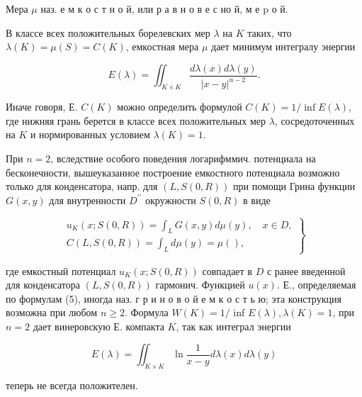 \documentclass[10pt]{article}
\begin{document}
Мера $\mu$ наз. е м к о с т н о й, или р а в н о в е с но й, м е p о й.



В классе всех положительных борелевских мер $\lambda$ на $K$ таких, что $\lambda(K)=\mu(S)=C(K)$, емкостная мера $\mu$ дает минимум интегралу энергии



\[

E(\lambda)=\iint_{K \times K} \frac{d \lambda(x) d \lambda(y)}{|x-y|^{n-2}} .

\]



Иначе говоря, Е. $C(K)$ можно определить формулой $C(K)=1 / \inf E(\lambda)$, где нижняя грань берется в классе всех положительных мер $\lambda$, сосредоточенных на $K$ и нормированных условием $\lambda(K)=1$.



При $n=2$, вследствие особого поведения логарифммич. потенциала на бесконечности, вышеуказанное построение емкостного потенциала возможно только для конденсатора, напр. для $(L, S(0, R))$ при помощи Грина функции $G(x, y)$ для внутренности $D^{\prime \prime}$ окружности $S(0, R)$ в виде



\[

\left.\begin{array}{l}

u_{K}(x ; S(0, R))=\int_{L} G(x, y) d \mu(y), \quad x \in D, \\

C(L, S(0, R))=\int_{L} d \mu(y)=\mu(),

\end{array}\right\}

\]



где емкостный потенциал $u_{K}(x ; S(0, R))$ совпадает в $D$ с ранее введенной для конденсатора $(L, S(0, R))$ гармонич. Функцией $u(x)$. Е., определяемая по формулам (5), иногда наз. г р и н о в о й е м к о с т ь ю; эта конструкция возможна при любом $n \geqslant 2$. Формула $W(K)=1 /$ inf $E(\lambda), \lambda(K)=1$, при $n=2$ дает винеровскую Е. компакта $K$, так как интеграл энергии



\[

E(\lambda)=\iint_{K \times K} \ln \frac{1}{x-y} d \lambda(x) d \lambda(y)

\]



теперь не всегда положителен.
\end{document}
